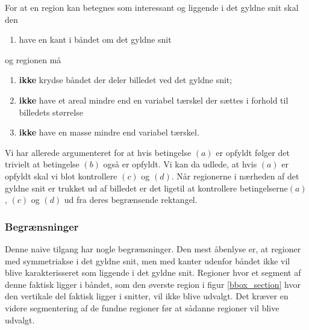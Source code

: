{\noindent For at en region kan betegnes som interessant og liggende i
det gyldne snit skal den
\begin{enumerate}
	\renewcommand{\labelenumi}{(\alph{enumi})}
	\item have en kant i båndet om det gyldne snit
\end{enumerate}
og regionen må
\begin{enumerate}
	\renewcommand{\labelenumi}{(\alph{enumi})}
	\setcounter{enumi}{1}
	\item \textbf{ikke} krydse båndet der deler billedet ved det gyldne snit;
	\item \textbf{ikke} have et areal mindre end en variabel tærskel der sættes i
		forhold til billedets størrelse
	\item \textbf{ikke} have en masse mindre end variabel tærskel.
\end{enumerate}
Vi har allerede argumenteret for at hvis betingelse $(a)$ er opfyldt
følger det trivielt at betingelse $(b)$ også er opfyldt. Vi
kan da udlede, at hvis $(a)$ er opfyldt skal vi blot kontrollere $(c)$
og $(d)$. Når regionerne i nærheden af det gyldne snit er trukket ud af
billedet er det ligetil at kontrollere betingelserne$(a)$, $(c)$ og
$(d)$ ud fra deres begrænsende rektangel.

\subsubsection{Begrænsninger}
Denne naive tilgang har nogle begrænsninger. Den mest åbenlyse er,
at regioner med symmetriakse i det gyldne snit, men med kanter udenfor
båndet ikke vil blive karakterisseret som liggende i det gyldne snit.
Regioner hvor et segment af denne faktisk ligger i båndet, som den
øverste region i figur \ref{bbox_section} hvor den vertikale del faktisk
ligger i snitter, vil ikke blive udvalgt. Det kræver en videre
segmentering af de fundne regioner før at sådanne regioner vil blive
udvalgt.

}

